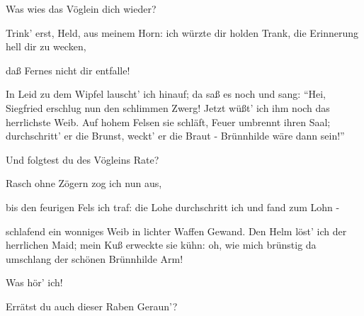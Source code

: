 \begin{drama}

Was wies das Vöglein dich wieder?
 

\Hagenspeaks



Trink' erst, Held, aus meinem Horn:
ich würzte dir holden Trank,
die Erinnerung hell dir zu wecken,


daß Fernes nicht dir entfalle!
 

\Siegfriedspeaks



In Leid zu dem Wipfel lauscht' ich hinauf;
da saß es noch und sang:
``Hei, Siegfried erschlug nun den schlimmen Zwerg!
Jetzt wüßt' ich ihm noch das herrlichste Weib.
Auf hohem Felsen sie schläft,
Feuer umbrennt ihren Saal;
durchschritt' er die Brunst,
weckt' er die Braut -
Brünnhilde wäre dann sein!''
 

\Hagenspeaks

Und folgtest du des Vögleins Rate?
 

\Siegfriedspeaks

Rasch ohne Zögern zog ich nun aus,


bis den feurigen Fels ich traf:
die Lohe durchschritt ich
und fand zum Lohn -


schlafend ein wonniges Weib
in lichter Waffen Gewand.
Den Helm löst' ich der herrlichen Maid;
mein Kuß erweckte sie kühn:
oh, wie mich brünstig da umschlang
der schönen Brünnhilde Arm!
 

\Guntherspeaks



Was hör' ich!
 




\Hagenspeaks

Errätst du auch dieser Raben Geraun'?
 





\end{drama}
